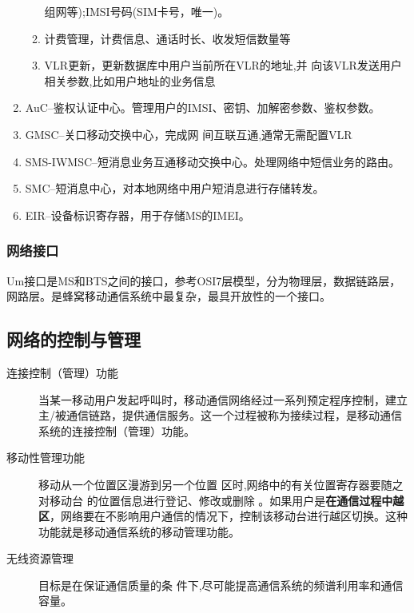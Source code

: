 \begin{enumerate}
\begin{enumerate}
			组网等);IMSI号码(SIM卡号，唯一)。
			\item 计费管理，计费信息、通话时长、收发短信数量等
			\item VLR更新，更新数据库中用户当前所在VLR的地址,并
			向该VLR发送用户相关参数,比如用户地址的业务信息
		\end{enumerate}
		\item AuC--鉴权认证中心。管理用户的IMSI、密钥、加解密参数、鉴权参数。
		\item GMSC--关口移动交换中心，完成网
		间互联互通,通常无需配置VLR
		\item SMS-IWMSC--短消息业务互通移动交换中心。处理网络中短信业务的路由。
		\item SMC--短消息中心，对本地网络中用户短消息进行存储转发。
		\item EIR--设备标识寄存器，用于存储MS的IMEI。
	\end{enumerate}
	\subsubsection{网络接口}
	Um接口是MS和BTS之间的接口，参考OSI7层模型，分为物理层，数据链路层，网路层。是蜂窝移动通信系统中最复杂，最具开放性的一个接口。
	\subsection{网络的控制与管理}
	\begin{description}
		\item[连接控制（管理）功能] 当某一移动用户发起呼叫时，移动通信网络经过一系列预定程序控制，建立主/被通信链路，提供通信服务。这一个过程被称为接续过程，是移动通信系统的连接控制（管理）功能。
		\item[移动性管理功能] 移动从一个位置区漫游到另一个位置
		区时,网络中的有关位置寄存器要随之对移动台
		的位置信息进行登记、修改或删除 。如果用户是\textbf{在通信过程中}\textbf{越区}，网络要在不影响用户通信的情况下，控制该移动台进行越区切换。这种功能就是移动通信系统的移动管理功能。
		\item[无线资源管理] 目标是在保证通信质量的条
		件下,尽可能提高通信系统的频谱利用率和通信
		容量。
		
	\end{description}

